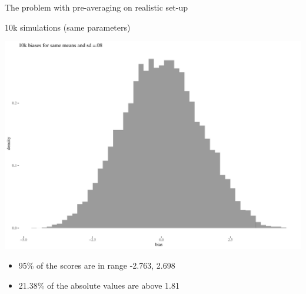 \documentclass[
  10pt,
  ignorenonframetext,
  x11names, dvipsnames, bibspacing,natbib, table]{beamer}
\providecommand{\tightlist}{%
  \setlength{\itemsep}{0pt}\setlength{\parskip}{0pt}}
\begin{document}
\begin{frame}{The problem with pre-averaging on realistic set-up}
\protect\hypertarget{the-problem-with-pre-averaging-on-realistic-set-up-1}{}
\begin{block}{10k simulations (same parameters)}
\protect\hypertarget{k-simulations-same-parameters}{}
\vspace{1mm}
\footnotesize

\begin{center}\includegraphics[width=0.8\linewidth]{presentationBoston_files/figure-beamer/unnamed-chunk-9-1} \end{center}
\vspace{1mm}
\footnotesize

\normalsize
\pause

\footnotesize

\vspace{-2mm}

\begin{itemize}
\tightlist
\item
  95\% of the scores are in range -2.763, 2.698
\item
  21.38\% of the absolute values are above 1.81
\end{itemize}
\end{block}
\end{frame}
\end{document}
